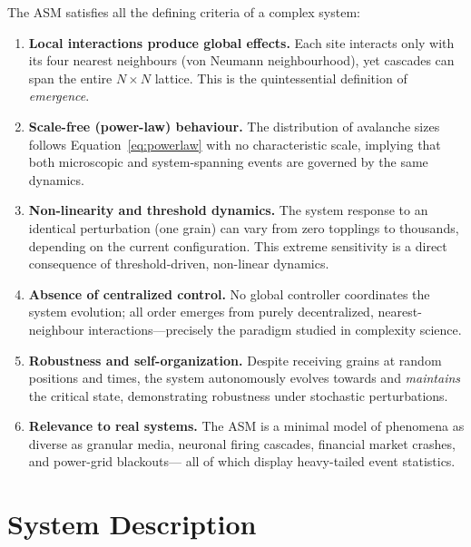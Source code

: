 \documentclass[12pt,a4paper]{article}
\begin{document}
The ASM satisfies all the defining criteria of a complex system:

\begin{enumerate}[leftmargin=1.5em, itemsep=3pt]

  \item \textbf{Local interactions produce global effects.}
        Each site interacts only with its four nearest neighbours (von Neumann
        neighbourhood), yet cascades can span the entire $N\times N$ lattice.
        This is the quintessential definition of \emph{emergence}.

  \item \textbf{Scale-free (power-law) behaviour.}
        The distribution of avalanche sizes follows Equation~\eqref{eq:powerlaw}
        with no characteristic scale, implying that both microscopic and
        system-spanning events are governed by the same dynamics.

  \item \textbf{Non-linearity and threshold dynamics.}
        The system response to an identical perturbation (one grain) can vary from
        zero topplings to thousands, depending on the current configuration.  This
        extreme sensitivity is a direct consequence of threshold-driven, non-linear
        dynamics.

  \item \textbf{Absence of centralized control.}
        No global controller coordinates the system evolution; all order emerges
        from purely decentralized, nearest-neighbour interactions—precisely the
        paradigm studied in complexity science.

  \item \textbf{Robustness and self-organization.}
        Despite receiving grains at random positions and times, the system
        autonomously evolves towards and \emph{maintains} the critical state,
        demonstrating robustness under stochastic perturbations.

  \item \textbf{Relevance to real systems.}
        The ASM is a minimal model of phenomena as diverse as granular media,
        neuronal firing cascades, financial market crashes, and power-grid blackouts—
        all of which display heavy-tailed event statistics.

\end{enumerate}

\section{System Description}
\end{document}
